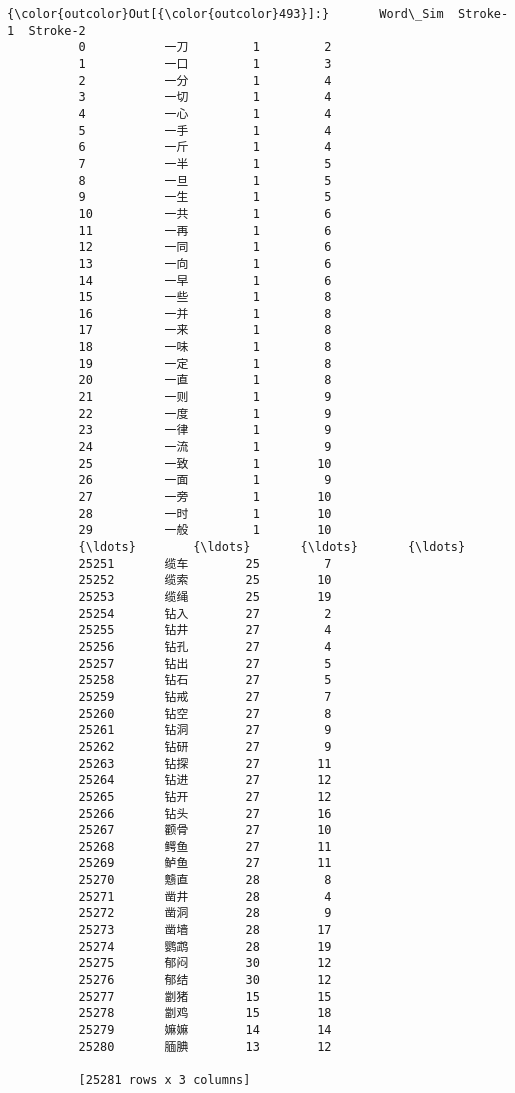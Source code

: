 \documentclass[11pt]{article}
\begin{document}
\begin{Verbatim}[commandchars=\\\{\}]
{\color{outcolor}Out[{\color{outcolor}493}]:}       Word\_Sim  Stroke-1  Stroke-2
          0           一刀         1         2
          1           一口         1         3
          2           一分         1         4
          3           一切         1         4
          4           一心         1         4
          5           一手         1         4
          6           一斤         1         4
          7           一半         1         5
          8           一旦         1         5
          9           一生         1         5
          10          一共         1         6
          11          一再         1         6
          12          一同         1         6
          13          一向         1         6
          14          一早         1         6
          15          一些         1         8
          16          一并         1         8
          17          一来         1         8
          18          一味         1         8
          19          一定         1         8
          20          一直         1         8
          21          一则         1         9
          22          一度         1         9
          23          一律         1         9
          24          一流         1         9
          25          一致         1        10
          26          一面         1         9
          27          一旁         1        10
          28          一时         1        10
          29          一般         1        10
          {\ldots}        {\ldots}       {\ldots}       {\ldots}
          25251       缆车        25         7
          25252       缆索        25        10
          25253       缆绳        25        19
          25254       钻入        27         2
          25255       钻井        27         4
          25256       钻孔        27         4
          25257       钻出        27         5
          25258       钻石        27         5
          25259       钻戒        27         7
          25260       钻空        27         8
          25261       钻洞        27         9
          25262       钻研        27         9
          25263       钻探        27        11
          25264       钻进        27        12
          25265       钻开        27        12
          25266       钻头        27        16
          25267       颧骨        27        10
          25268       鳄鱼        27        11
          25269       鲈鱼        27        11
          25270       戆直        28         8
          25271       凿井        28         4
          25272       凿洞        28         9
          25273       凿墙        28        17
          25274       鹦鹉        28        19
          25275       郁闷        30        12
          25276       郁结        30        12
          25277       劏猪        15        15
          25278       劏鸡        15        18
          25279       嫲嫲        14        14
          25280       腼腆        13        12
          
          [25281 rows x 3 columns]
\end{Verbatim}
            
\end{document}
